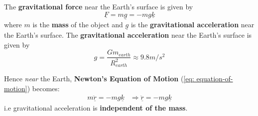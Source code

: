 \begin{definition}
	The {\bf gravitational force} near the Earth's surface is given by
	$$\underline{F} = m\underline{g} = -mg\underline{k}$$
	where $m$ is the {\bf mass} of the object and $\underline{g}$ is the {\bf gravitational acceleration} near the Earth's surface. The {\bf gravitational acceleration} near the Earth's surface is given by
	$$g = \frac{Gm_{earth}}{R^{2}_{earth}} \approx 9.8m/s^2 $$
\end{definition}
\begin{note}
	Hence {\em near} the Earth, {\bf Newton's Equation of Motion} (\ref{eq: equation-of-motion}) becomes:
	$$\begin{aligned} m\underline{\ddot{r}} = -mg\underline{k} &\Rightarrow \underline{\ddot{r}} = -mg\underline{k} \end{aligned}$$
	i.e gravitational acceleration is {\bf independent of the mass}.

\end{note}
